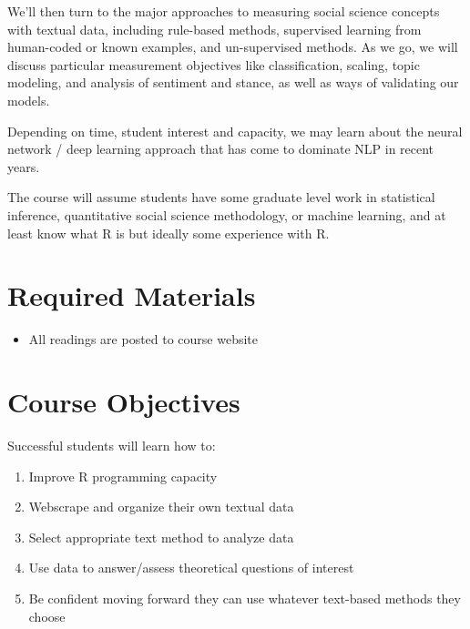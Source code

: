 \documentclass[11pt]{article}
\begin{document}
We'll then turn to the major approaches to measuring social science concepts with textual data, including rule-based methods, supervised learning from human-coded or known examples, and un-supervised methods. As we go, we will discuss particular measurement objectives like classification, scaling, topic modeling, and analysis of sentiment and stance, as well as ways of validating our models. 

Depending on time, student interest and capacity, we may learn about the neural network / deep learning approach that has come to dominate NLP in recent years.

The course will assume students have some graduate level work in statistical inference, quantitative social science methodology, or machine learning, and at least know what R is but ideally some experience with R.

\bigskip



\section*{Required Materials}

\begin{itemize}
\item All readings are posted to course website
\end{itemize}




\section*{Course Objectives}
Successful students will learn how to:
\begin{enumerate}
\item Improve R programming capacity
\item Webscrape and organize their own textual data
\item Select appropriate text method to analyze data
\item Use data to answer/assess theoretical questions of interest
\item Be confident moving forward they can use whatever text-based methods they choose
\end{enumerate}
\end{document}
